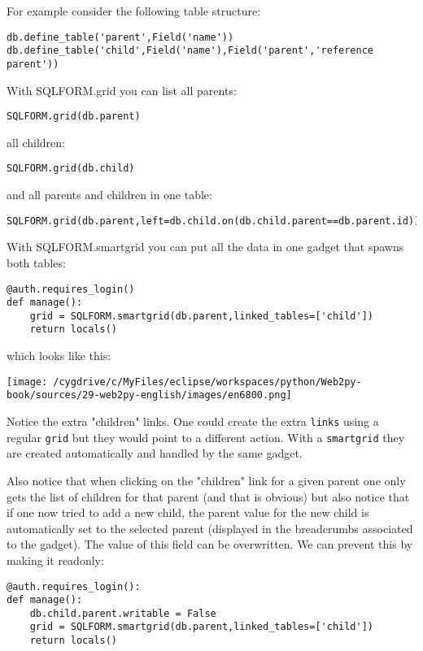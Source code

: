 \documentclass[justified,sixbynine,notoc]{tufte-book}
\def\ft{\small\tt}
\begin{document}
\begin{fullwidth}
For example consider the following table structure:

\begin{lstlisting}
db.define_table('parent',Field('name'))
db.define_table('child',Field('name'),Field('parent','reference parent'))
\end{lstlisting}

With SQLFORM.grid you can list all parents:

\begin{lstlisting}
SQLFORM.grid(db.parent)
\end{lstlisting}
all children:
\begin{lstlisting}
SQLFORM.grid(db.child)
\end{lstlisting}
and all parents and children in one table:
\begin{lstlisting}
SQLFORM.grid(db.parent,left=db.child.on(db.child.parent==db.parent.id))
\end{lstlisting}

With SQLFORM.smartgrid you can put all the data in one gadget that spawns both tables:

\begin{lstlisting}
@auth.requires_login()
def manage():
    grid = SQLFORM.smartgrid(db.parent,linked_tables=['child'])
    return locals()
\end{lstlisting}
\noindent which looks like this:


\goodbreak\begin{center}\texttt{[image: /cygdrive/c/MyFiles/eclipse/workspaces/python/Web2py-book/sources/29-web2py-english/images/en6800.png]}\end{center}


Notice the extra "children" links. One could create the extra {\ft links} using a regular {\ft grid} but they would point to a different action. With a {\ft smartgrid} they are created automatically and handled by the same gadget.

Also notice that when clicking on the "children" link for a given parent one only gets the list of children for that parent (and that is obvious) but also notice that if one now tried to add a new child, the parent value for the new child is automatically set to the selected parent (displayed in the breadcrumbs associated to the gadget). The value of this field can be overwritten. We can prevent this by making it readonly:

\begin{lstlisting}
@auth.requires_login():
def manage():
    db.child.parent.writable = False
    grid = SQLFORM.smartgrid(db.parent,linked_tables=['child'])
    return locals()
\end{lstlisting}


\end{fullwidth}
\end{document}
